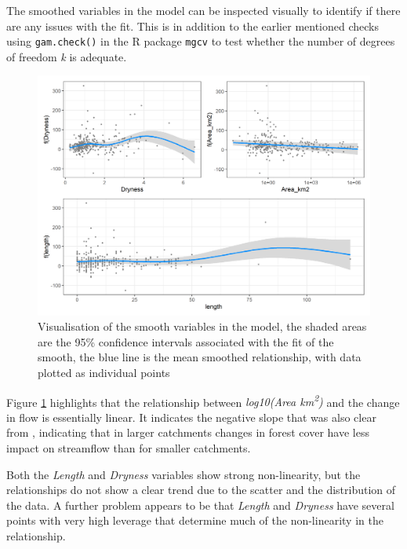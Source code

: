 \documentclass[]{elsarticle} %
\begin{document}
The smoothed variables in the model can be inspected visually to identify if there are any issues with the fit. This is in addition to the earlier mentioned checks using \texttt{gam.check()} in the R package \texttt{mgcv} to test whether the number of degrees of freedom \emph{k} is adequate.

\begin{figure}
\includegraphics[width=0.9\linewidth]{Forest_model_allsmooths} \caption{Visualisation of the smooth variables in the model, the shaded areas are the 95\% confidence intervals associated with the fit of the smooth, the blue line is the mean smoothed relationship, with data plotted as individual points}\label{fig:smoothsmodelall}
\end{figure}

Figure \ref{fig:smoothsmodelall} highlights that the relationship between \emph{log10(Area km\textsuperscript{2})} and the change in flow is essentially linear. It indicates the negative slope that was also clear from \citet{zhang2017}, indicating that in larger catchments changes in forest cover have less impact on streamflow than for smaller catchments.

Both the \emph{Length} and \emph{Dryness} variables show strong non-linearity, but the relationships do not show a clear trend due to the scatter and the distribution of the data. A further problem appears to be that \emph{Length} and \emph{Dryness} have several points with very high leverage that determine much of the non-linearity in the relationship.
\end{document}

